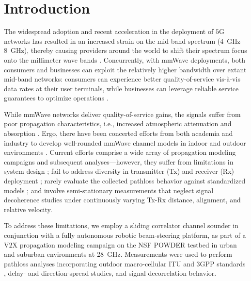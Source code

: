 \documentclass[10pt, twocolumn]{IEEEtran}
\begin{document}
\section{Introduction}\label{S1}
The widespread adoption and recent acceleration in the deployment of $5$G networks has resulted in an increased strain on the mid-band spectrum (\SIrange{4}{8}{\giga\hertz}), thereby causing providers around the world to shift their spectrum focus onto the millimeter wave bands \cite{Commercial}. Concurrently, with mmWave deployments, both consumers and businesses can exploit the relatively higher bandwidth over extant mid-band networks: consumers can experience better quality-of-service vis-\`{a}-vis data rates at their user terminals, while businesses can leverage reliable service guarantees to optimize operations \cite{Rappaport, UCSB}. 

While mmWave networks deliver quality-of-service gains, the signals suffer from poor propagation characteristics, i.e., increased atmospheric attenuation and absorption \cite{Rappaport}. Ergo, there have been concerted efforts from both academia and industry to develop well-rounded mmWave channel models in indoor and outdoor environments \cite{Indoor60G, QDC, NISTModeling, MacCartneyUrbanHumanBlockage}. Current efforts comprise a wide array of propagation modeling campaigns and subsequent analyses---however, they suffer from limitations in system design \cite{Agile-Link, Harvard}; fail to address diversity in transmitter (Tx) and receiver (Rx) deployment \cite{Purdue, MolischSpatialOutdoor}; rarely evaluate the collected pathloss behavior against standardized models \cite{Outdoor28G, Commercial}; and involve semi-stationary measurements \cite{Qualcomm3GPP, CapacityEvaluation} that neglect signal decoherence studies under continuously varying Tx-Rx distance, alignment, and relative velocity.

To address these limitations, we employ a sliding correlator channel sounder \cite{Sounder} in conjunction with a fully autonomous robotic beam-steering platform, as part of a V$2$X propagation modeling campaign on the NSF POWDER testbed \cite{POWDER} in urban and suburban environments at \SI{28}{\giga\hertz}.  Measurements were used to perform pathloss analyses incorporating outdoor macro-cellular ITU and $3$GPP standards \cite{MacCartneyModelsOverview, Qualcomm3GPP}, delay- and direction-spread studies, and signal decorrelation behavior.
\end{document}
